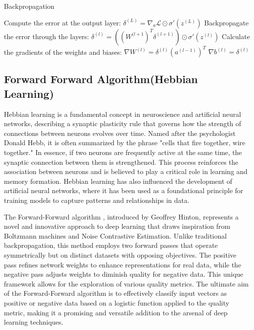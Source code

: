 \documentclass[nohyperref]{article}
\theoremstyle{plain}
\theoremstyle{definition}
\theoremstyle{remark}
\begin{document}
\begin{algorithm}[tb]
     \caption{Backpropagation}
   \label{alg:BP}

  \begin{algorithmic}
\STATE Compute the error at the output layer:
\STATE $\delta^{(L)} = \nabla_a \mathcal{L} \odot \sigma'(z^{(L)})$
    \STATE Backpropagate the error through the layers:
    \STATE $\delta^{(l)} = ((W^{(l+1})^T \delta^{(l+1)}) \odot \sigma'(z^{(l)})$
    \STATE Calculate the gradients of the weights and biases:
    \STATE $\nabla W^{(l)} = \delta^{(l)}(a^{(l-1)})^T$
    \STATE $\nabla b^{(l)} = \delta^{(l)}$
\ENDFOR    
\end{algorithmic}
\end{algorithm}



\subsection{Forward Forward Algorithm(Hebbian Learning)}
Hebbian learning is a fundamental concept in neuroscience and artificial neural networks, describing a synaptic plasticity rule that governs how the strength of connections between neurons evolves over time. Named after the psychologist Donald Hebb, it is often summarized by the phrase "cells that fire together, wire together." In essence, if two neurons are frequently active at the same time, the synaptic connection between them is strengthened. This process reinforces the association between neurons and is believed to play a critical role in learning and memory formation. Hebbian learning has also influenced the development of artificial neural networks, where it has been used as a foundational principle for training models to capture patterns and relationships in data.

The Forward-Forward algorithm \cite{hinton2022forward}, introduced by Geoffrey Hinton, represents a novel and innovative approach to deep learning that draws inspiration from Boltzmann machines and Noise Contrastive Estimation. Unlike traditional backpropagation, this method employs two forward passes that operate symmetrically but on distinct datasets with opposing objectives. The positive pass refines network weights to enhance representations for real data, while the negative pass adjusts weights to diminish quality for negative data. This unique framework allows for the exploration of various quality metrics. The ultimate aim of the Forward-Forward algorithm is to effectively classify input vectors as positive or negative data based on a logistic function applied to the quality metric, making it a promising and versatile addition to the arsenal of deep learning techniques.
\end{document}
